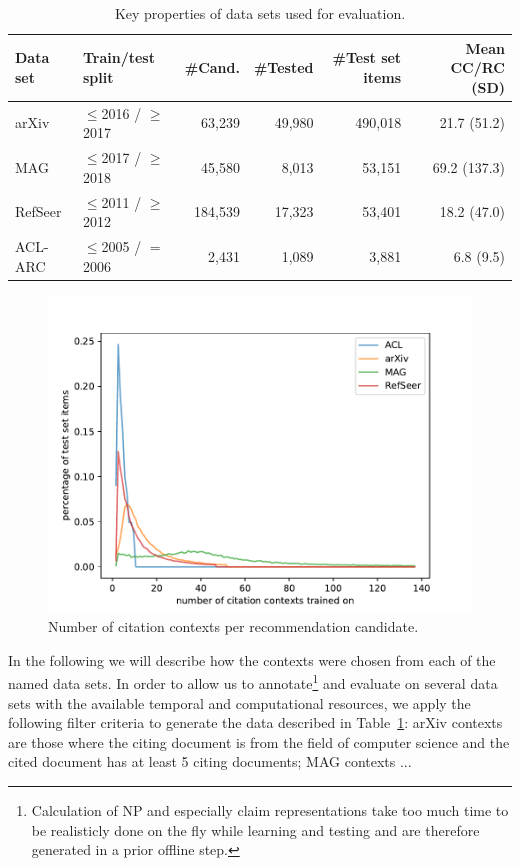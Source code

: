 \begin{table}[]
\centering
    \caption{Key properties of data sets used for evaluation.}
    \label{tab:datasetprops}
\begin{center}
    \begin{tabular}{llrrrr}
    \toprule %
    Data set & Train/test split & \#Cand. & \#Tested & \#Test set items & Mean CC/RC (SD)\\ 
    \midrule
    arXiv & $\le$2016 / $\ge$2017 & 63,239 & 49,980 & 490,018 & 21.7 (\hphantom{1}51.2) \\
    MAG & $\le$2017 / $\ge$2018 & 45,580 & 8,013 & 53,151 & 69.2 (137.3) \\
    RefSeer & $\le$2011 / $\ge$2012 & 184,539 & 17,323 & 53,401 & 18.2 (\hphantom{1}47.0)\\
    ACL-ARC & $\le$2005 / $=$2006 & 2,431 & 1,089 & 3,881 & \hphantom{1}6.8 (\hphantom{10}9.5) \\
    \bottomrule
    \end{tabular}
\end{center}
\end{table}

\begin{figure}[]
  \centering
    \includegraphics[width=.8\textwidth]{figures/evaluation/comparison_contexts_per_cited_doc.pdf}
  \caption{Number of citation contexts per recommendation candidate.}
  \label{fig:evalcomp}
\end{figure}

In the following we will describe how the contexts were chosen from each of the named data sets. In order to allow us to annotate\footnote{Calculation of NP and especially claim representations take too much time to be realisticly done on the fly while learning and testing and are therefore generated in a prior offline step.} and evaluate on several data sets with the available temporal and computational resources, we apply the following filter criteria to generate the data described in Table~\ref{tab:datasetprops}: arXiv contexts are those where the citing document is from the field of computer science and the cited document has at least 5 citing documents; MAG contexts ...

